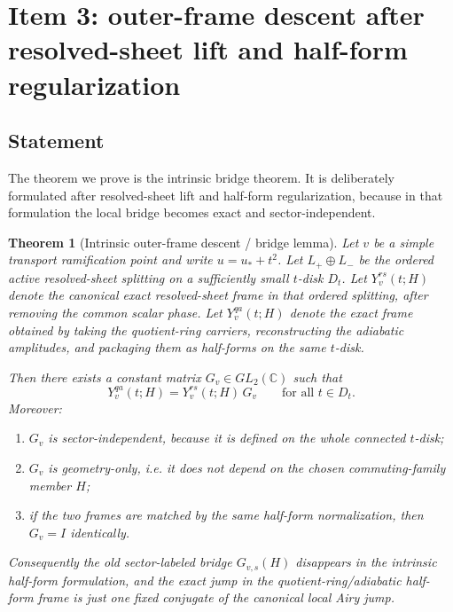 \documentclass[11pt]{article}
\numberwithin{equation}{section}
\newtheorem{theorem}{Theorem}[section]
\theoremstyle{definition}
\newcommand{\C}{\mathbb C}
\begin{document}
\section{Item 3: outer-frame descent after resolved-sheet lift and half-form regularization}
\label{sec:outer-descent}

\subsection{Statement}

The theorem we prove is the intrinsic bridge theorem. It is deliberately formulated after resolved-sheet lift and half-form regularization, because in that formulation the local bridge becomes exact and sector-independent.

\begin{theorem}[Intrinsic outer-frame descent / bridge lemma]
\label{thm:bridge}
Let $v$ be a simple transport ramification point and write $u=u_*+t^2$. Let $L_+\oplus L_-$ be the ordered active resolved-sheet splitting on a sufficiently small $t$-disk $D_t$. Let $Y_v^{rs}(t;H)$ denote the canonical exact resolved-sheet frame in that ordered splitting, after removing the common scalar phase. Let $Y_v^{qa}(t;H)$ denote the exact frame obtained by taking the quotient-ring carriers, reconstructing the adiabatic amplitudes, and packaging them as half-forms on the same $t$-disk.

Then there exists a constant matrix $G_v\in GL_2(\C)$ such that
\begin{equation}
\label{eq:bridge-constant}
 Y_v^{qa}(t;H)=Y_v^{rs}(t;H)\,G_v
 \qquad \text{for all } t\in D_t.
\end{equation}
Moreover:
\begin{enumerate}
  \item $G_v$ is sector-independent, because it is defined on the whole connected $t$-disk;
  \item $G_v$ is geometry-only, i.e. it does not depend on the chosen commuting-family member $H$;
  \item if the two frames are matched by the same half-form normalization, then $G_v=I$ identically.
\end{enumerate}
Consequently the old sector-labeled bridge $G_{v,s}(H)$ disappears in the intrinsic half-form formulation, and the exact jump in the quotient-ring/adiabatic half-form frame is just one fixed conjugate of the canonical local Airy jump.
\end{theorem}
\end{document}
